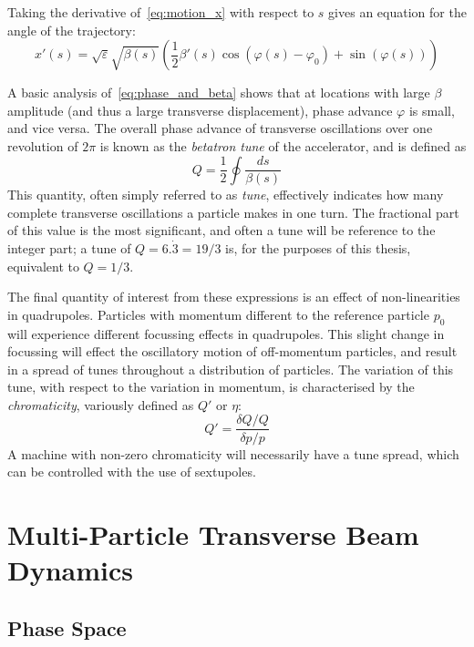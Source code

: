 \documentclass[11pt]{report}
\begin{document}
Taking the derivative of~\eqref{eq:motion_x} with respect to $s$ gives an equation for the angle of the trajectory:
\begin{equation}
x'(s)=\sqrt{\varepsilon}\sqrt{\beta(s)}\left(\frac12\beta'(s)\cos(\varphi(s)-\varphi_0)+\sin(\varphi(s))\right)
\label{eq:motion_px}
\end{equation}

A basic analysis of~\eqref{eq:phase_and_beta} shows that at locations with large $\beta$ amplitude (and thus a large transverse displacement), phase advance $\varphi$ is small, and vice versa. The overall phase advance of transverse oscillations over one revolution of $2\pi$ is known as the \textit{betatron tune} of the accelerator, and is defined as
\begin{equation}
  Q=\frac12\oint\frac{ds}{\beta(s)}
  \label{eq:betatron_tune}
\end{equation}
This quantity, often simply referred to as \textit{tune}, effectively indicates how many complete transverse oscillations a particle makes in one turn. The fractional part of this value is the most significant, and often a tune will be reference to the integer part; a tune of $Q=6.\dot 3=19/3$ is, for the purposes of this thesis, equivalent to $Q=1/3$.

The final quantity of interest from these expressions is an effect of non-linearities in quadrupoles. Particles with momentum different to the reference particle $p_0$ will experience different focussing effects in quadrupoles. This slight change in focussing will effect the oscillatory motion of off-momentum particles, and result in a spread of tunes throughout a distribution of particles. The variation of this tune, with respect to the variation in momentum, is characterised by the \textit{chromaticity}, variously defined as $Q'$ or $\eta$:
\begin{equation}
  Q' = \frac{\delta Q/Q}{\delta p/p}
  \label{eq:chroma}
\end{equation}
A machine with non-zero chromaticity will necessarily have a tune spread, which can be controlled with the use of sextupoles.

\clearpage

\section{Multi-Particle Transverse Beam Dynamics}\label{sec:theory-transverse}

\subsection{Phase Space}\label{subsec:trans_phase_space}
\end{document}

